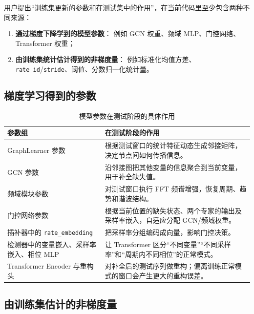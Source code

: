 \documentclass[UTF8,11pt,a4paper]{ctexart}
\begin{document}
用户提出“训练集更新的参数和在测试集中的作用”，在当前代码里至少包含两种不同来源：
\begin{enumerate}
  \item \textbf{通过梯度下降学到的模型参数}：
  例如 GCN 权重、频域 MLP、门控网络、Transformer 权重；
  \item \textbf{由训练集统计估计得到的非梯度量}：
  例如标准化均值方差、\texttt{rate\_id}/\texttt{stride}、阈值、分数归一化统计量。
\end{enumerate}

\subsection{梯度学习得到的参数}

\begin{table}[H]
\centering
\caption{模型参数在测试阶段的具体作用}
\begin{tabularx}{\textwidth}{@{}l Y@{}}
\toprule
参数组 & 在测试阶段的作用 \\
\midrule
GraphLearner 参数 &
根据测试窗口的统计特征动态生成邻接矩阵，决定节点间如何传播信息。 \\
GCN 参数 &
沿邻接图把其他变量的信息聚合到当前变量，用于补全缺失值。 \\
频域模块参数 &
对测试窗口执行 FFT 频谱增强，恢复周期、趋势和谐波结构。 \\
门控网络参数 &
根据当前位置的缺失状态、两个专家的输出及采样率嵌入，自适应分配 GCN/频域权重。 \\
插补器中的 \texttt{rate\_embedding} &
把采样率分组编码成向量，影响门控决策。 \\
检测器中的变量嵌入、采样率嵌入、相位 MLP &
让 Transformer 区分“不同变量”“不同采样率”和“周期内不同相位”的正常模式。 \\
Transformer Encoder 与重构头 &
对补全后的测试序列做重构；偏离训练正常模式的窗口会产生更大的重构误差。 \\
\bottomrule
\end{tabularx}
\end{table}

\subsection{由训练集估计的非梯度量}
\end{document}
